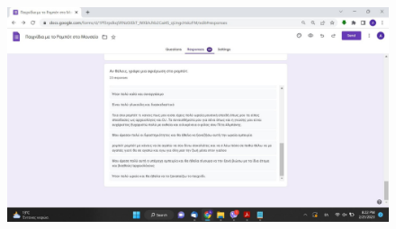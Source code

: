 \begin{figure}[H]\centering
  \includegraphics[scale=0.4]{./figures/parts/appendix/chapters/06/indy_kids_3.jpg}
\end{figure}

